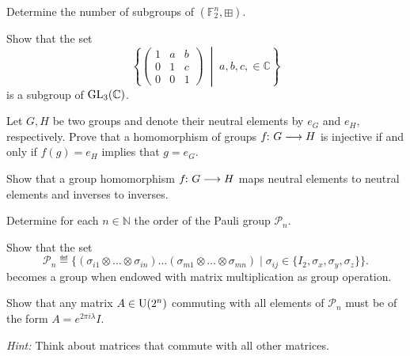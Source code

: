 \documentclass[a4paper, oneside, 12pt]{amsart}
\newcommand*{\PauliGroup}{\ensuremath{\mathcal{P}}}
\begin{document}
\begin{exercise}
  Determine the number of subgroups of \(( \mathbb{F}_{2}^{n},  \boxplus)\).
\end{exercise}

\begin{exercise}
  Show that the set
  \begin{equation*}
    \left\{
      \begin{pmatrix}
        1 & a & b \\
        0 & 1 & c \\
        0 & 0 & 1
      \end{pmatrix} \;\middle| \; a,b,c, \in \mathbb{C}
    \right\}
  \end{equation*}
is a subgroup of \(\operatorname{GL}_{3}( \mathbb{C})\).
\end{exercise}

\begin{exercise}
  Let \(G, H\) be two groups and denote their neutral elements by \(e_{G}\) and \(e_{H}\), respectively.
  Prove that a homomorphism of groups \(f\from G\to H \) is injective if and only if \(f(g) = e_{H}\) implies that \(g=e_{G}\).
\end{exercise}

\begin{exercise}
  Show that a group homomorphism \(f\from G \to H\) maps neutral elements to neutral elements and inverses to inverses.
\end{exercise}


\begin{exercise}
Determine for each \(n\in \mathbb{N}\) the order of the Pauli group \(\PauliGroup_{n}\).
\end{exercise}

\begin{exercise}\label{exe:n-Pauli-group-is-group}
  Show that the set
  \begin{equation*}
    \PauliGroup_{n} \eqdef\big\{ (\sigma_{i1}\otimes \dots \otimes \sigma_{in}) \dots  (\sigma_{m1}\otimes \dots \otimes \sigma_{mn}) \mid \sigma_{ij} \in\{ I_{2}, \sigma_{x}, \sigma_{y}, \sigma_{z}\}\big\}.
  \end{equation*}
  becomes a group when endowed with matrix multiplication as group operation.
\end{exercise}

\begin{exercise}\label{exe:centre-of-matrices}
  Show that any matrix \(A\in \operatorname{U}(2^{n})\) commuting with all elements of \(\PauliGroup_{n}\) must be of the form \(A= e^{2\pi i \lambda}I\).

  \textit{Hint:} Think about matrices that commute with all other matrices.
\end{exercise}
\end{document}
